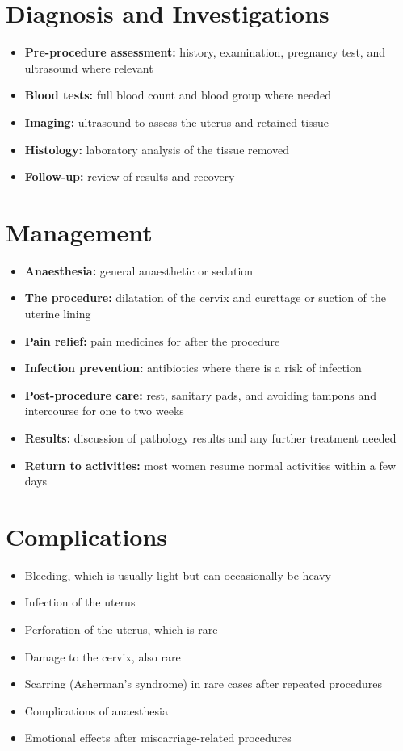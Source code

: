 \section*{Diagnosis and Investigations}
\begin{itemize}
    \item \textbf{Pre-procedure assessment:} history, examination, pregnancy test, and ultrasound where relevant
    \item \textbf{Blood tests:} full blood count and blood group where needed
    \item \textbf{Imaging:} ultrasound to assess the uterus and retained tissue
    \item \textbf{Histology:} laboratory analysis of the tissue removed
    \item \textbf{Follow-up:} review of results and recovery
\end{itemize}

\section*{Management}
\begin{itemize}
    \item \textbf{Anaesthesia:} general anaesthetic or sedation
    \item \textbf{The procedure:} dilatation of the cervix and curettage or suction of the uterine lining
    \item \textbf{Pain relief:} pain medicines for after the procedure
    \item \textbf{Infection prevention:} antibiotics where there is a risk of infection
    \item \textbf{Post-procedure care:} rest, sanitary pads, and avoiding tampons and intercourse for one to two weeks
    \item \textbf{Results:} discussion of pathology results and any further treatment needed
    \item \textbf{Return to activities:} most women resume normal activities within a few days
\end{itemize}

\section*{Complications}
\begin{itemize}
    \item Bleeding, which is usually light but can occasionally be heavy
    \item Infection of the uterus
    \item Perforation of the uterus, which is rare
    \item Damage to the cervix, also rare
    \item Scarring (Asherman's syndrome) in rare cases after repeated procedures
    \item Complications of anaesthesia
    \item Emotional effects after miscarriage-related procedures
\end{itemize}

